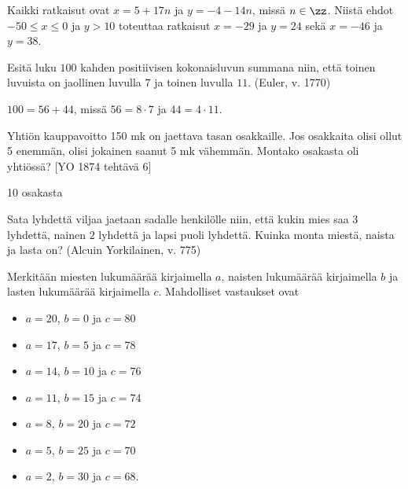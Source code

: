 \begin{kotitehtavasivu}
\begin{tehtava}
    \begin{vastaus}
        Kaikki ratkaisut ovat $x = 5 + 17n$ ja $y = -4 - 14n$, missä $n\in\zz$. Niistä ehdot $-50 \le x \le 0$ ja $y > 10$ toteuttaa ratkaisut $x = -29$ ja $y = 24$ sekä $x = -46$ ja $y = 38$.
    \end{vastaus}
    
\end{tehtava}

\begin{tehtava}
    Esitä luku $100$ kahden positiivisen kokonaisluvun summana niin, että toinen luvuista on jaollinen luvulla $7$ ja toinen luvulla $11$. (Euler, v. 1770)
    
    \begin{vastaus}
        $100 = 56 + 44$, missä $56 = 8 \cdot 7$ ja $44 = 4 \cdot 11$.
    \end{vastaus}
    
\end{tehtava}

\begin{tehtava}
    Yhtiön kauppavoitto 150 mk on jaettava tasan osakkaille. Jos osakkaita olisi ollut 5 enemmän, olisi jokainen saanut 5 mk vähemmän. Montako osakasta oli yhtiössä?  [YO 1874 tehtävä 6]
    
    \begin{vastaus}
        10 osakasta
    \end{vastaus}
    
\end{tehtava}

\begin{tehtava}
    Sata lyhdettä viljaa jaetaan sadalle henkilölle niin, että kukin mies saa $3$ lyhdettä, nainen $2$ lyhdettä ja lapsi puoli lyhdettä. Kuinka monta miestä, naista ja lasta on? (Alcuin Yorkilainen, v. 775)
    
    \begin{vastaus}
        Merkitään miesten lukumäärää kirjaimella $a$, naisten lukumäärää kirjaimella $b$ ja lasten lukumäärää kirjaimella $c$. Mahdolliset vastaukset ovat
        \begin{itemize}
            \item $a = 20$, $b = 0$ ja $c = 80$
            \item $a = 17$, $b = 5$ ja $c = 78$
            \item $a = 14$, $b = 10$ ja $c = 76$
            \item $a = 11$, $b = 15$ ja $c = 74$
            \item $a = 8$, $b = 20$ ja $c = 72$
            \item $a = 5$, $b = 25$ ja $c = 70$
            \item $a = 2$, $b = 30$ ja $c = 68$.
        \end{itemize}
    \end{vastaus}
    

\end{tehtava}
\end{kotitehtavasivu}
